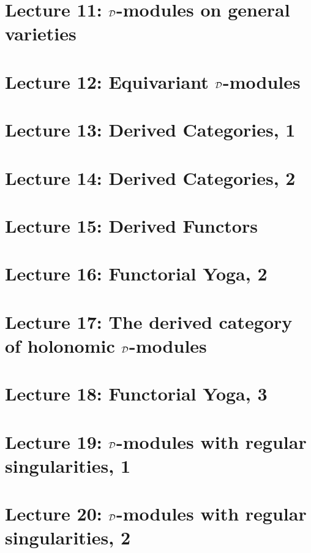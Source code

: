 \documentclass[12pt]{amsbook}
\begin{document}
\part{Lecture 11: $\mathcal{D}$-modules on general varieties}
\part{Lecture 12: Equivariant $\mathcal{D}$-modules}
\part{Lecture 13: Derived Categories, 1}
\part{Lecture 14: Derived Categories, 2}
\part{Lecture 15: Derived Functors}
\part{Lecture 16: Functorial Yoga, 2}
\part{Lecture 17: The derived category of holonomic $\mathcal{D}$-modules}
\part{Lecture 18: Functorial Yoga, 3}
\part{Lecture 19: $\mathcal{D}$-modules with regular singularities, 1}
\part{Lecture 20: $\mathcal{D}$-modules with regular singularities, 2}
\end{document}
